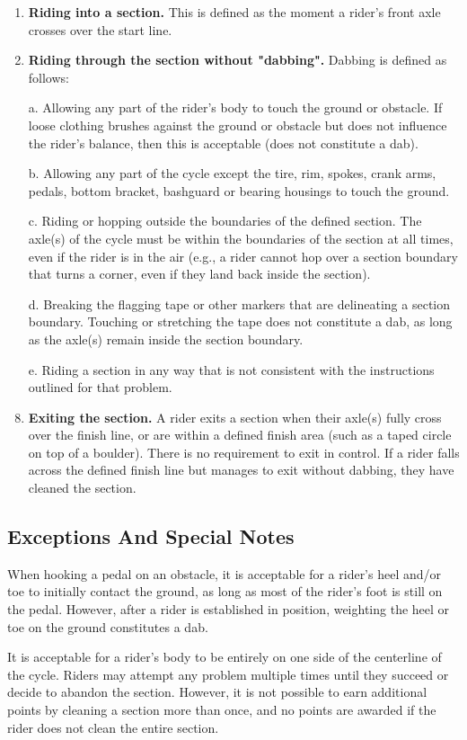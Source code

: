 \begin{enumerate}
\item \textbf{Riding into a section.} This is defined as the moment a rider's front axle crosses over the start line.
\item \textbf{Riding through the section without "dabbing".} Dabbing is defined as follows:
\item[a.] Allowing any part of the rider's body to touch the ground or obstacle. 
If loose clothing brushes against the ground or obstacle but does not influence the rider's balance, then this is acceptable (does not constitute a dab).
\item[b.] Allowing any part of the cycle except the tire, rim, spokes, crank arms, pedals, bottom bracket, bashguard or bearing housings to touch the ground.
\item[c.] Riding or hopping outside the boundaries of the defined section.
The axle(s) of the cycle must be within the boundaries of the section at all times, even if the rider is in the air (e.g., a rider cannot hop over a section boundary that turns a corner, even if they land back inside the section).
\item[d.] Breaking the flagging tape or other markers that are delineating a section boundary. 
Touching or stretching the tape does not constitute a dab, as long as the axle(s) remain inside the section boundary.
\item[e.] Riding a section in any way that is not consistent with the instructions outlined for that problem.
\item \textbf{Exiting the section.} A rider exits a section when their axle(s) fully cross over the finish line, or are within a
defined finish area (such as a taped circle on top of a boulder). 
There is no requirement to exit in control.
If a rider falls across the defined finish line but manages to exit without dabbing, they have cleaned the section.
\end{enumerate}

\subsection{Exceptions And Special Notes}
When hooking a pedal on an obstacle, it is acceptable for a rider's heel and/or toe to initially contact the ground, as long
as most of the rider's foot is still on the pedal. 
However, after a rider is established in position, weighting the heel or toe on the ground constitutes a dab.

It is acceptable for a rider’s body to be entirely on one side of the centerline of the cycle.
Riders may attempt any problem multiple times until they succeed or decide to abandon the section.
However, it is not possible to earn additional points by cleaning a section more than once, and no points are awarded if the rider does not clean the entire section.

